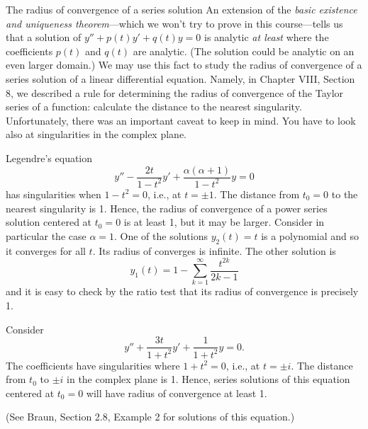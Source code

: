 \subhead The radius of convergence of a series solution \endsubhead
An extension of the {\it basic existence and 
uniqueness theorem\/}---which we won't try to prove in this course---tells
us that a solution of
$y'' + p(t)y' + q(t)y = 0$  is analytic {\it at least\/} where
the  coefficients  $p(t)$ and $q(t)$ are analytic.   (The solution
could be
analytic on an even larger domain.)  We may use this fact to
%
study the radius of convergence of a series
solution of a linear differential equation.  
Namely, in Chapter VIII, Section 8,
we described a rule for determining the radius of convergence
of the Taylor series of a function:  calculate the
distance to the nearest singularity.  Unfortunately, there
was an important caveat to keep in mind.  You have to look also at
singularities in the complex plane.

  Legendre's
equation
$$
y'' - \frac{2t}{1 - t^2} y' + \frac{\alpha(\alpha +1)}{1 - t^2}y = 0
$$
has singularities when $1 - t^2 = 0$, i.e., at $t = \pm 1$.
The distance from $t_0 = 0$ to the nearest singularity is 1.
Hence, the radius
of convergence of a power series solution centered at $t_0 = 0$ is
at least 1, but it may be larger.   Consider in particular
the case $\alpha = 1$.   One of the solutions $y_2(t) = t$
is a polynomial and so it converges for all $t$.  Its radius of
converges is infinite.   The other solution is
$$
y_1(t) = 1 - \sum_{k=1}^\infty \frac{t^{2k}}{2k -1}
$$
and it is easy to check by the ratio test that its radius
of convergence is precisely 1.
\endexample

\nextex
{}  Consider
$$
y'' + \frac{3t}{1 + t^2}y' + \frac 1{1+ t^2} y = 0.
$$
The coefficients have singularities where $1 + t^2 = 0$,
i.e., at $t = \pm i$.  The distance from $t_0$ to
$\pm i$ in the complex plane is 1.   Hence, series solutions
of this equation centered at $t_0 = 0$ will have radius of
convergence at least 1.

(See Braun, Section 2.8, Example 2 for solutions of this equation.)
\endexample

